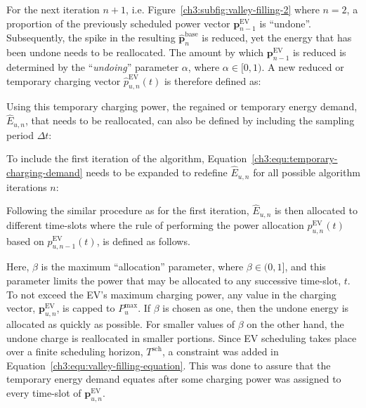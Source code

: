 For the next iteration $n+1$, i.e. Figure~\ref{ch3:subfig:valley-filling-2} where $n=2$, a proportion of the previously scheduled power vector $\textbf{p}^\text{EV}_{n-1}$ is ``undone''.
Subsequently, the spike in the resulting $\hat{\textbf{p}}^\text{base}_{n}$ is reduced, yet the energy that has been undone needs to be reallocated.
The amount by which $\textbf{p}^\text{EV}_{n-1}$ is reduced is determined by the ``\textit{undoing}'' parameter $\alpha$, where $\alpha \in [0, 1)$.
A new reduced or temporary charging vector $\hat{p}^\text{EV}_{u, n}(t)$ is therefore defined as:



Using this temporary charging power, the regained or temporary energy demand, $\hat{E}_{u,n}$, that needs to be reallocated, can also be defined by including the sampling period $\Delta t$:



To include the first iteration of the algorithm, Equation~\ref{ch3:equ:temporary-charging-demand} needs to be expanded to redefine $\hat{E}_{u,n}$ for all possible algorithm iterations $n$:



Following the similar procedure as for the first iteration, $\hat{E}_{u,n}$ is then allocated to different time-slots where the rule of performing the power allocation $p^\text{EV}_{u,n}(t)$ based on $p^\text{EV}_{u,n-1}(t)$, is defined as follows.



\nomenclature[K]{$\beta$}{Allocation parameter to assign a portion of the temporary energy demand, $\hat{E}_{u,n}$, where $\beta \in (0, 1]$}

Here, $\beta$ is the maximum ``allocation'' parameter, where $\beta \in (0, 1]$, and this parameter limits the power that may be allocated to any successive time-slot, $t$.
To not exceed the EV's maximum charging power, any value in the charging vector, $\textbf{p}^\text{EV}_{u,n}$, is capped to $P^\text{max}_{u}$.
If $\beta$ is chosen as one, then the undone energy is allocated as quickly as possible.
For smaller values of $\beta$ on the other hand, the undone charge is reallocated in smaller portions.
Since EV scheduling takes place over a finite scheduling horizon, $T^\text{sch}$, a constraint was added in Equation~\ref{ch3:equ:valley-filling-equation}.
This was done to assure that the temporary energy demand equates after some charging power was assigned to every time-slot of $\textbf{p}^\text{EV}_{u,n}$.

